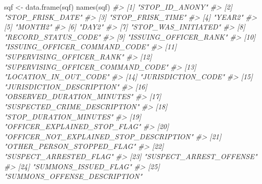 \documentclass[
]{krantz}
\makeatletter
\newenvironment{Shaded}{\begin{snugshade}}{\end{snugshade}}
\newcommand{\CommentTok}[1]{\textcolor[rgb]{0.37,0.37,0.37}{\textit{#1}}}
\newcommand{\FunctionTok}[1]{\textcolor[rgb]{0,0,0}{#1}}
\newcommand{\NormalTok}[1]{#1}
\newcommand{\OtherTok}[1]{\textcolor[rgb]{0.37,0.37,0.37}{#1}}
\newenvironment{kframe}{%
\medskip{}
\setlength{\fboxsep}{.8em}
 \def\at@end@of@kframe{}%
 \ifinner\ifhmode%
  \def\at@end@of@kframe{\end{minipage}}%
  \begin{minipage}{\columnwidth}%
 \fi\fi%
 \def\FrameCommand##1{\hskip\@totalleftmargin \hskip-\fboxsep
 \colorbox{shadecolor}{##1}\hskip-\fboxsep
     \hskip-\linewidth \hskip-\@totalleftmargin \hskip\columnwidth}%
 \MakeFramed {\advance\hsize-\width
   \@totalleftmargin\z@ \linewidth\hsize
   \@setminipage}}%
 {\par\unskip\endMakeFramed%
 \at@end@of@kframe}
\renewenvironment{Shaded}{\begin{kframe}}{\end{kframe}}
\makeatother
\begin{document}
\begin{Shaded}
\begin{Highlighting}[]
\NormalTok{sqf }\OtherTok{\textless{}{-}} \FunctionTok{data.frame}\NormalTok{(sqf)}
\FunctionTok{names}\NormalTok{(sqf)}
\CommentTok{\#\textgreater{}  [1] "STOP\_ID\_ANONY"                                             }
\CommentTok{\#\textgreater{}  [2] "STOP\_FRISK\_DATE"                                           }
\CommentTok{\#\textgreater{}  [3] "STOP\_FRISK\_TIME"                                           }
\CommentTok{\#\textgreater{}  [4] "YEAR2"                                                     }
\CommentTok{\#\textgreater{}  [5] "MONTH2"                                                    }
\CommentTok{\#\textgreater{}  [6] "DAY2"                                                      }
\CommentTok{\#\textgreater{}  [7] "STOP\_WAS\_INITIATED"                                        }
\CommentTok{\#\textgreater{}  [8] "RECORD\_STATUS\_CODE"                                        }
\CommentTok{\#\textgreater{}  [9] "ISSUING\_OFFICER\_RANK"                                      }
\CommentTok{\#\textgreater{} [10] "ISSUING\_OFFICER\_COMMAND\_CODE"                              }
\CommentTok{\#\textgreater{} [11] "SUPERVISING\_OFFICER\_RANK"                                  }
\CommentTok{\#\textgreater{} [12] "SUPERVISING\_OFFICER\_COMMAND\_CODE"                          }
\CommentTok{\#\textgreater{} [13] "LOCATION\_IN\_OUT\_CODE"                                      }
\CommentTok{\#\textgreater{} [14] "JURISDICTION\_CODE"                                         }
\CommentTok{\#\textgreater{} [15] "JURISDICTION\_DESCRIPTION"                                  }
\CommentTok{\#\textgreater{} [16] "OBSERVED\_DURATION\_MINUTES"                                 }
\CommentTok{\#\textgreater{} [17] "SUSPECTED\_CRIME\_DESCRIPTION"                               }
\CommentTok{\#\textgreater{} [18] "STOP\_DURATION\_MINUTES"                                     }
\CommentTok{\#\textgreater{} [19] "OFFICER\_EXPLAINED\_STOP\_FLAG"                               }
\CommentTok{\#\textgreater{} [20] "OFFICER\_NOT\_EXPLAINED\_STOP\_DESCRIPTION"                    }
\CommentTok{\#\textgreater{} [21] "OTHER\_PERSON\_STOPPED\_FLAG"                                 }
\CommentTok{\#\textgreater{} [22] "SUSPECT\_ARRESTED\_FLAG"                                     }
\CommentTok{\#\textgreater{} [23] "SUSPECT\_ARREST\_OFFENSE"                                    }
\CommentTok{\#\textgreater{} [24] "SUMMONS\_ISSUED\_FLAG"                                       }
\CommentTok{\#\textgreater{} [25] "SUMMONS\_OFFENSE\_DESCRIPTION"                               }

\end{Highlighting}
\end{Shaded}
\end{document}
